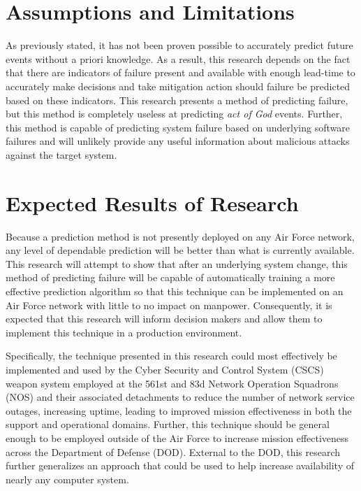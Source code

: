 \section{Assumptions and Limitations}
As previously stated, it has not been proven possible to accurately predict
future events without a priori knowledge.  As a result, this research depends
on the fact that there are indicators of failure present and available with
enough lead-time to accurately make decisions and take mitigation action should
failure be predicted based on these indicators.  This research presents a
method of predicting failure, but this method is completely useless at
predicting \emph{act of God} events.  Further, this method is capable of
predicting system failure based on underlying software failures and will
unlikely provide any useful information about malicious attacks against the
target system.

\section{Expected Results of Research}
Because a prediction method is not presently deployed on any Air Force network,
any level of dependable prediction will be better than what is currently
available.  This research will attempt to show that after an underlying system
change, this method of predicting failure will be capable of automatically
training a more effective prediction algorithm so that this technique can be
implemented on an Air Force network with little to no impact on manpower.
Consequently, it is expected that this research will inform decision makers and
allow them to implement this technique in a production environment.

Specifically, the technique presented in this research could most effectively
be implemented and used by the Cyber Security and Control System (CSCS) weapon
system employed at the 561st and 83d Network Operation Squadrons (NOS) and
their associated detachments to reduce the number of network service outages,
increasing uptime, leading to improved mission effectiveness in both the
support and operational domains.  Further, this technique should be general
enough to be employed outside of the Air Force to increase mission
effectiveness across the Department of Defense (DOD).  External to the DOD,
this research further generalizes an approach that could be used to help
increase availability of nearly any computer system.
